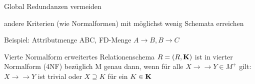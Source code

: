 \documentclass[a4paper]{article}
\begin{document}
\begin{multicols}{3}
\begin{description*}
        \begin{itemize*}
            \item Global Redundanzen vermeiden
            \item andere Kriterien (wie Normalformen) mit möglichst wenig Schemata erreichen
            \item Beispiel: Attributmenge ABC, FD-Menge ${A \rightarrow B, B \rightarrow C}$
        \end{itemize*}
        \item[Vierte Normalform] erweitertes Relationenschema $R = (R, \bf{K})$ ist in vierter Normalform (4NF) bezüglich M genau dann, wenn für alle $X\rightarrow\rightarrow Y \in M^+$ gilt: $X\rightarrow\rightarrow Y$ ist trivial oder $X\supseteq K$ für ein $K\in\bf{K}$
    \end{description*}


\end{multicols}
\end{document}
